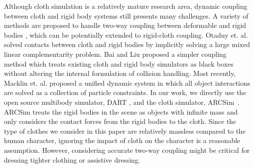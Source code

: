 
Although cloth simulation is a relatively mature research area, dynamic
coupling between cloth and rigid body systems still presents many
challenges. A variety of methods are proposed to handle two-way coupling
between deformable and rigid bodies
\cite{Jansson:2003:CDR,Sifakis:2007:HSD,Shinar:2008:TCR,Otaduy:2009:ICH,Miguel:2011:ESC,Macklin:2014:unified},
which can be potentially extended to rigid-cloth coupling. Otaduy et. al.
\cite{Otaduy:2009:ICH} solved contacts between cloth and rigid bodies by
implicitly solving a large mixed linear complementarity problem. Bai and
Liu \cite{Bai:2014:CCR} proposed a simpler coupling method which treats
existing cloth and rigid body simulators as black boxes without altering
the internal formulation of collision handling. Most recently, Macklin et. al. proposed a unified dynamic system in which all object interactions are solved as a collection of particle constraints. In our work, we directly
use the open source multibody simulator, DART \cite{Liu:2012:STM}, and the
cloth simulator, ARCSim~\cite{Narain:2012:AAR,Narain:2013:FCA}. ARCSim
treats the rigid bodies in the scene as objects with infinite mass and
only considers the contact forces from the rigid bodies to the cloth.
Since the type of clothes we consider in this paper are relatively
massless compared to the human character, ignoring the impact of cloth on
the character is a reasonable assumption. However, considering accurate
two-way coupling might be critical for dressing tighter clothing or
assistive dressing.
